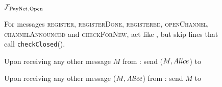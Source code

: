 \begin{figure}[H]
  \begin{systembox}{$\mathcal{F}_{\mathrm{PayNet}}{}_{\mathrm{, Open}}$}
    \begin{algorithmic}[1]
      \State For messages \textsc{register}, \textsc{registerDone},
      \textsc{registered}, \textsc{openChannel}, \textsc{channelAnnounced} and
      \textsc{checkForNew}, act like \fpaynet{}, but skip lines that call
      \texttt{checkClosed}().
      \Statex

      \State Upon receiving any other message $M$ from \alice:
      \Indent
          \State send ($M, \mathit{Alice}$) to \simulator
        \EndIf
      \EndIndent
      \Statex

      \State Upon receiving any other message ($M, \mathit{Alice}$) from \simulator:
      \Indent
          \State send $M$ to \alice
        \EndIf
      \EndIndent
    \end{algorithmic}
  \end{systembox}
  \caption{}
  \label{alg:proof:fpaynet:open}
\end{figure}

